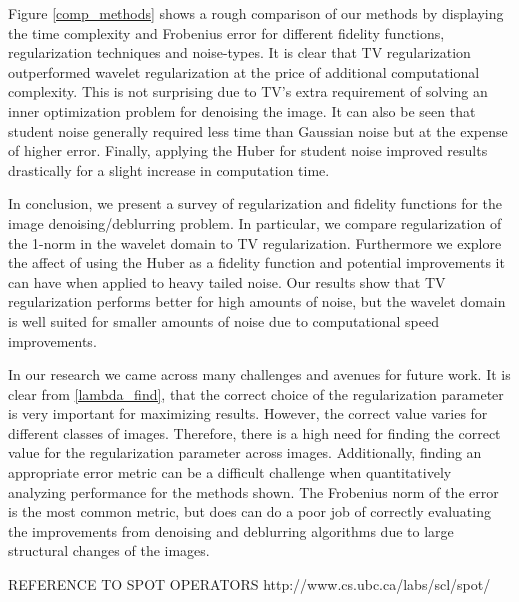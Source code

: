 \documentclass[10pt,a4paper]{article}
\begin{document}
	
	Figure \ref{comp_methods} shows a rough comparison of our methods by displaying the time complexity and Frobenius error for different fidelity functions, regularization techniques and noise-types. It is clear that TV regularization outperformed wavelet regularization at the price of additional computational complexity. This is not surprising due to TV's extra requirement of solving an inner optimization problem for denoising the image. It can also be seen that student noise generally required less time than Gaussian noise but at the expense of higher error. Finally, applying the Huber for student noise improved results drastically for a slight increase in computation time.  
	
	In conclusion, we present a survey of regularization and fidelity functions for the image denoising/deblurring problem. In particular, we compare regularization of the 1-norm in the wavelet domain to TV regularization. Furthermore we explore the affect of using the Huber as a fidelity function and potential improvements it can have when applied to heavy tailed noise. Our results show that TV regularization performs better for high amounts of noise, but the wavelet domain is well suited for smaller amounts of noise due to computational speed improvements. 
	
	In our research we came across many challenges and avenues for future work. It is clear from \ref{lambda_find}, that the correct choice of the regularization parameter is very important for maximizing results. However, the correct value varies for different classes of images. Therefore, there is a high need for finding the correct value for the regularization parameter across images. Additionally, finding an appropriate error metric can be a difficult challenge when quantitatively analyzing performance for the methods shown. The Frobenius norm of the error is the most common metric, but does can do a poor job of correctly evaluating the improvements from denoising and deblurring algorithms due to large structural changes of the images. 
	
	
	
	
	
	
	
	
	REFERENCE TO SPOT OPERATORS http://www.cs.ubc.ca/labs/scl/spot/
	
	
\end{document}
